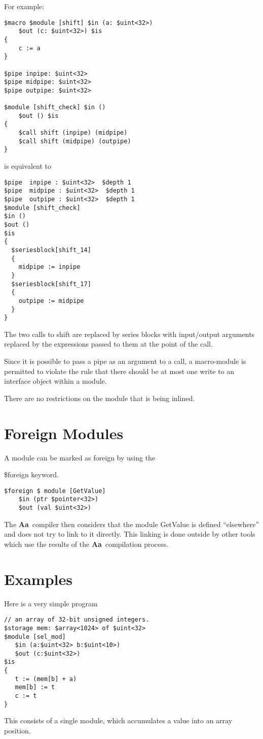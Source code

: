 \documentclass{article}
\newcommand{\Aa}{{\bf Aa}~}
\begin{document}
For example:
\begin{verbatim}
$macro $module [shift] $in (a: $uint<32>) 
    $out (c: $uint<32>) $is
{
    c := a 
}  

$pipe inpipe: $uint<32>
$pipe midpipe: $uint<32>
$pipe outpipe: $uint<32>

$module [shift_check] $in () 
    $out () $is
{
    $call shift (inpipe) (midpipe)
    $call shift (midpipe) (outpipe)
}

\end{verbatim}
is equivalent to 
\begin{verbatim}
$pipe  inpipe : $uint<32>  $depth 1 
$pipe  midpipe : $uint<32>  $depth 1 
$pipe  outpipe : $uint<32>  $depth 1 
$module [shift_check]
$in ()
$out ()
$is
{
  $seriesblock[shift_14] 
  {
    midpipe := inpipe
  }
  $seriesblock[shift_17] 
  {
    outpipe := midpipe
  }
}
\end{verbatim}
The two calls to shift are replaced by
series blocks with input/output arguments
replaced by the expressions passed to them
at the point of the call.

Since it is possible to pass a pipe as an 
argument to a call, a macro-module is permitted
to violate the rule that there should
be at most one write to an interface object
within a module.

There are no restrictions on the
module that is being inlined.

\section{Foreign Modules}


A module can be marked as foreign by using the

\$foreign keyword.
\begin{verbatim}
$foreign $ module [GetValue]
	$in (ptr $pointer<32>)
	$out (val $uint<32>)
\end{verbatim}

The \Aa compiler then considers that the module GetValue
is defined ``elsewhere'' and does not try to link to it
directly.  This linking is done outside by other tools which
use the results of the \Aa compilation process.

\section{Examples}


Here is a very simple program
\begin{verbatim}
// an array of 32-bit unsigned integers.
$storage mem: $array<1024> of $uint<32> 
$module [sel_mod]
   $in (a:$uint<32> b:$uint<10>)
   $out (c:$uint<32>)
$is
{
   t := (mem[b] + a)
   mem[b] := t
   c := t
}
\end{verbatim}
This consists of a single module, which accumulates
a value into an array position.
\end{document}
